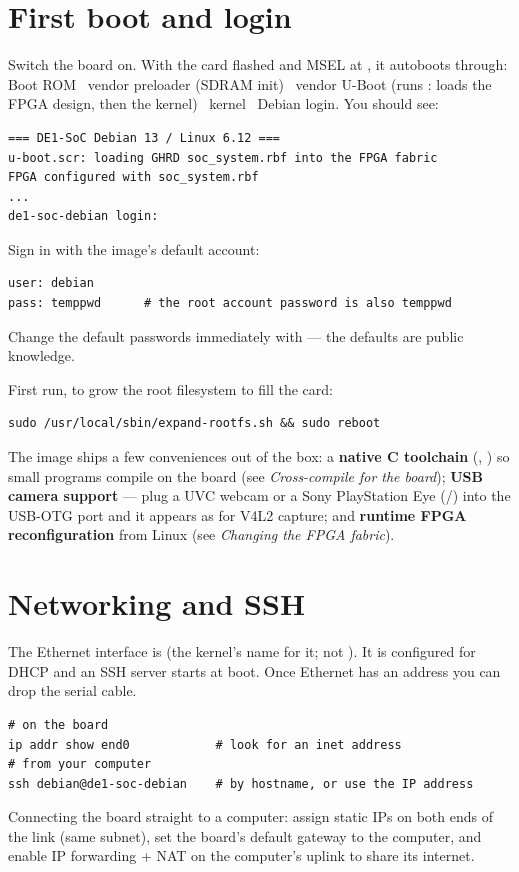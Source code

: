 \section{First boot and login}
Switch the board on. With the card flashed and MSEL at , it autoboots
through: Boot ROM \arr\ vendor preloader (SDRAM init) \arr\ vendor U-Boot (runs
: loads the FPGA design, then the kernel) \arr\ kernel \arr\
Debian login. You should see:
\begin{lstlisting}
=== DE1-SoC Debian 13 / Linux 6.12 ===
u-boot.scr: loading GHRD soc_system.rbf into the FPGA fabric
FPGA configured with soc_system.rbf
...
de1-soc-debian login:
\end{lstlisting}

\medskip\noindent Sign in with the image's default account:
\begin{lstlisting}
user: debian
pass: temppwd      # the root account password is also temppwd
\end{lstlisting}
\begin{warn}
Change the default passwords immediately with  --- the defaults are
public knowledge.
\end{warn}
First run, to grow the root filesystem to fill the card:
\begin{lstlisting}
sudo /usr/local/sbin/expand-rootfs.sh && sudo reboot
\end{lstlisting}

\begin{note}
The image ships a few conveniences out of the box: a \textbf{native C toolchain}
(\code{gcc}, \code{make}) so small programs compile on the board (see
\emph{Cross-compile for the board}); \textbf{USB camera support} --- plug a
UVC webcam or a Sony PlayStation Eye (\code{gspca}/\code{ov534}) into the USB-OTG
port and it appears as \code{/dev/video0} for V4L2 capture; and \textbf{runtime
FPGA reconfiguration} from Linux (see \emph{Changing the FPGA fabric}).
\end{note}

\section{Networking and SSH}
The Ethernet interface is  (the kernel's name for it; not ).
It is configured for DHCP and an SSH server starts at boot. Once Ethernet
has an address you can drop the serial cable.
\begin{lstlisting}
# on the board
ip addr show end0            # look for an inet address
# from your computer
ssh debian@de1-soc-debian    # by hostname, or use the IP address
\end{lstlisting}
\begin{tip}
Connecting the board straight to a computer: assign static IPs on both ends of the
link (same subnet), set the board's default gateway to the computer, and enable IP
forwarding + NAT on the computer's uplink to share its internet.
\end{tip}

